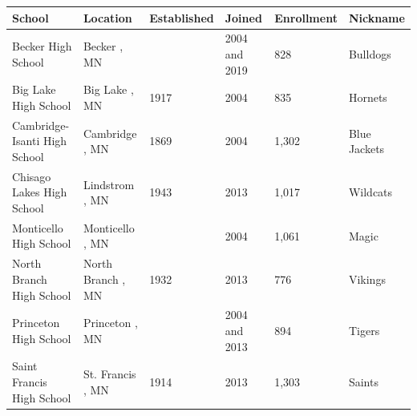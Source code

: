 \documentclass{article}
\begin{document}
\begin{tabular}{llllll}
\toprule
School & Location & Established & Joined & Enrollment & Nickname \\
\midrule
Becker High School & Becker , MN &  & 2004 and 2019 & 828 & Bulldogs \\
Big Lake High School & Big Lake , MN & 1917 & 2004 & 835 & Hornets \\
Cambridge-Isanti High School & Cambridge , MN & 1869 & 2004 & 1,302 & Blue Jackets \\
Chisago Lakes High School & Lindstrom , MN & 1943 & 2013 & 1,017 & Wildcats \\
Monticello High School & Monticello , MN &  & 2004 & 1,061 & Magic \\
North Branch High School & North Branch , MN & 1932 & 2013 & 776 & Vikings \\
Princeton High School & Princeton , MN &  & 2004 and 2013 & 894 & Tigers \\
Saint Francis High School & St. Francis , MN & 1914 & 2013 & 1,303 & Saints \\
\bottomrule
\end{tabular}
\end{document}
